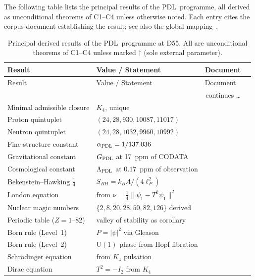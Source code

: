 \documentclass[12pt,a4paper]{article}
\theoremstyle{definition}
\newcommand{\PDL}{\textsc{PDL}}
\begin{document}
The following table lists the principal results of the \PDL\ programme, all derived as unconditional theorems of C1--C4 unless otherwise noted. Each entry cites the corpus document establishing the result; see also the global mapping~\cite{PDL_DM}.

\begin{longtable}{lp{7.5cm}lp{2cm}}
\caption{Principal derived results of the \PDL\ programme at D55. All are unconditional theorems of C1--C4 unless marked $\dagger$ (sole external parameter).}
\label{tab:results}\\
\toprule
Result & Value / Statement & Document \\
\midrule
\endfirsthead
\toprule
Result & Value / Statement & Document \\
\midrule
\endhead
\midrule
\multicolumn{3}{r}{\footnotesize continues \ldots}\\
\endfoot
\bottomrule
\endlastfoot
Minimal admissible closure & $K_4$, unique & \cite{PDL_D16a} \\[0.3em]
Proton quintuplet & $(24,28,930,10087,11017)$ & \cite{PDL_D16,PDL_D16b} \\[0.3em]
Neutron quintuplet & $(24,28,1032,9960,10992)$ & \cite{PDL_D22} \\[0.3em]
Fine-structure constant & $\alpha_{\PDL} = 1/137.036$ & \cite{PDL_D25} \\[0.3em]
Gravitational constant & $G_{\PDL}$ at 17~ppm of CODATA & \cite{PDL_D44} \\[0.3em]
Cosmological constant & $\Lambda_{\PDL}$ at $0.17$~ppm of observation & \cite{PDL_D51,PDL_D52,PDL_D53} \\[0.3em]
Bekenstein--Hawking $\tfrac{1}{4}$ & $S_{BH} = k_B A / (4\ell_P^2)$ & \cite{PDL_D50} \\[0.3em]
London equation & from $\nu = \tfrac{1}{4}\|\psi_1 - T^k\psi_1\|^2$ & \cite{PDL_D49} \\[0.3em]
Nuclear magic numbers & $\{2,8,20,28,50,82,126\}$ derived & \cite{PDL_D47} \\[0.3em]
Periodic table ($Z=1$--82) & valley of stability as corollary & \cite{PDL_D47} \\[0.3em]
Born rule (Level~1) & $P = |\psi|^2$ via Gleason & \cite{PDL_D34} \\[0.3em]
Born rule (Level~2) & $\mathrm{U}(1)$ phase from Hopf fibration & \cite{PDL_D46} \\[0.3em]
Schr\"odinger equation & from $K_4$ pulsation & \cite{PDL_D32} \\[0.3em]
Dirac equation & $T^2 = -I_2$ from $K_4$ & \cite{PDL_D33} \\[0.3em]

\end{longtable}
\end{document}
